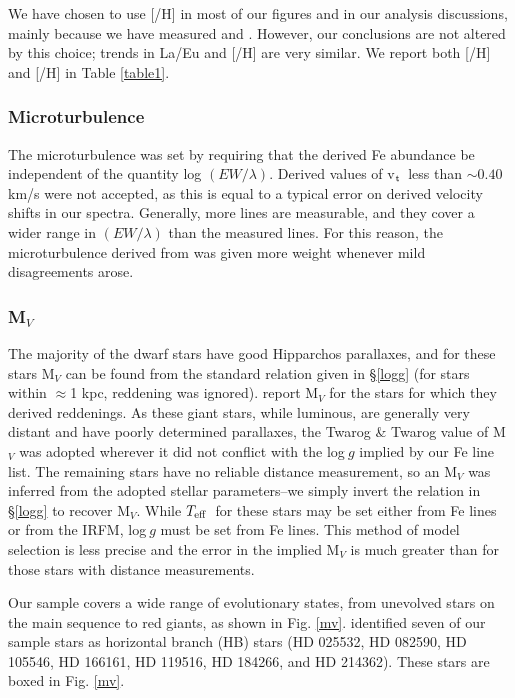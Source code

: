 \documentclass[12pt,preprint]{aastex}
\def\teff{\mbox{$T_{\rm {eff}}$}}
\def\vt{\mbox{v$_{\rm t}$}}
\begin{document}
We have chosen to use [/H] in most of our figures and in our analysis discussions, mainly because we have measured  and .  However, our conclusions are not altered by this choice; trends in La/Eu and [/H] are very similar.  We report both [/H] and [/H] in Table \ref{table1}.  

\subsubsection{Microturbulence}

The microturbulence was set by requiring that the derived Fe abundance be independent of the quantity log $(EW/\lambda)$.  Derived values of \vt~less than $\sim 0.40~$km/s were not accepted, as this is equal to a typical error on derived velocity shifts in our spectra.  Generally, more  lines are measurable, and they cover a wider range in $(EW/\lambda)$ than the measured  lines.  For this reason, the microturbulence derived from  was given more weight whenever mild disagreements arose.  

\subsubsection{M$_V$}

The majority of the dwarf stars have good Hipparchos parallaxes, and for these stars M$_V$ can be found from the standard relation given in \S \ref{logg} (for stars within $\approx$1 kpc, reddening was ignored).  \citet{Twarog1994} report M$_V$ for the stars for which they derived reddenings.  As these giant stars, while luminous, are generally very distant and have poorly determined parallaxes, the Twarog \& Twarog value of M$_V$ was adopted wherever it did not conflict with the log$~g$ implied by our Fe line list.  The remaining stars have no reliable distance measurement, so an M$_V$ was inferred from the adopted stellar parameters--we simply invert the relation in \S \ref{logg} to recover M$_V$.  While \teff~for these stars may be set either from Fe lines or from the IRFM, log$~g$ must be set from Fe lines.  This method of model selection is less precise and the error in the implied M$_V$ is much greater than for those stars with distance measurements.  

Our sample covers a wide range of evolutionary states, from unevolved stars on the main sequence to red giants, as shown in Fig. \ref{mv}.  \citet{Behr2003} identified seven of our sample stars as horizontal branch (HB) stars (HD 025532, HD 082590, HD 105546, HD 166161, HD 119516, HD 184266, and HD 214362).  These stars are boxed in Fig. \ref{mv}.
\end{document}
